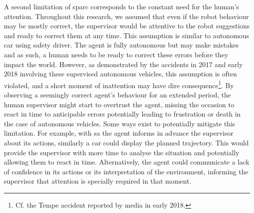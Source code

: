 A second limitation of \gls{sparc} corresponds to the constant need for the human's attention. Throughout this research, we assumed that even if the robot behaviour may be mostly correct, the supervisor would be attentive to the robot suggestions and ready to correct them at any time. This assumption is similar to autonomous car using safety driver. The agent is fully autonomous but may make mistakes and as such, a human needs to be ready to correct these errors before they impact the world. However, as demonstrated by the accidents in 2017 and early 2018 involving these supervised autonomous vehicles, this assumption is often violated, and a short moment of inattention may have dire consequence\footnote{Cf. the Tempe accident reported by media in early 2018.}. By observing a seemingly correct agent's behaviour for an extended period, the human supervisor might start to overtrust the agent, missing the occasion to react in time to anticipable errors potentially leading to frustration or death in the case of autonomous vehicles. Some ways exist to potentially mitigate this limitation. For example, with \gls{sa} the agent informs in advance the supervisor about its actions, similarly a car could display the planned trajectory. This would provide the supervisor with more time to analyse the situation and potentially allowing them to react in time. Alternatively, the agent could communicate a lack of confidence in its actions or its interpretation of the environment, informing the supervisor that attention is specially required in that moment.

